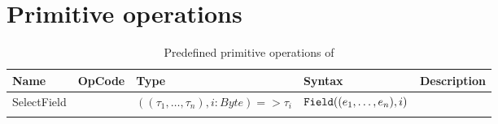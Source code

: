 \section{Primitive operations}
\label{sec:appendix:primops}

\begin{table}[h]
    \small
    \begin{tabu}{|l |l |l |l |l |}
     \hline
     \rowfont{\bfseries}
        Name   &   OpCode   &  Type  & Syntax & Description \\
     \hline
        SelectField	&		&	$((\tau_1,\dots,\tau_n), i: Byte) => \tau_i$	&	$\SelectField{(e_1,\dots,e_n)}{i}$	&  \\
     \hline
         	&		&		&     &		\\
    \hline
    \end{tabu}
    \caption{Predefined primitive operations of \langname}
    \label{table:primops}
\end{table}

